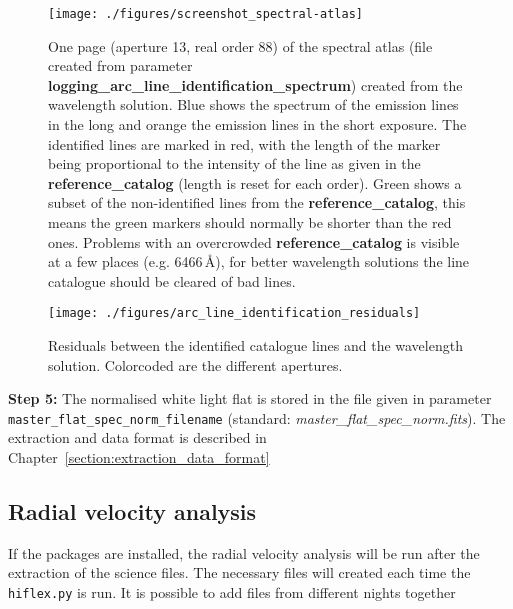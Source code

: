 \documentclass[10pt,a4paper]{article}
\begin{document}
\begin{figure} 
  \begin{center}
    \texttt{[image: ./figures/screenshot\_spectral-atlas]}
  \end{center} 
  \caption{One page (aperture 13, real order 88) of the spectral atlas (file created from parameter \textbf{logging\_arc\_line\_identification\_spectrum}) created from the wavelength solution. Blue shows the spectrum of the emission lines in the long and orange the emission lines in the short exposure. The identified lines are marked in red, with the length of the marker being proportional to the intensity of the line as given in the \textbf{reference\_catalog} (length is reset for each order). Green shows a subset of the non-identified lines from the \textbf{reference\_catalog}, this means the green markers should normally be shorter than the red ones. Problems with an overcrowded \textbf{reference\_catalog} is visible at a few places (e.g. 6466\,\AA), for better wavelength solutions the line catalogue should be cleared of bad lines.
    \label{figure_arc_line_identification_spectrum}}
\end{figure}


\begin{figure} 
  \begin{center}
    \texttt{[image: ./figures/arc\_line\_identification\_residuals]}
  \end{center} 
  \caption{Residuals between the identified catalogue lines and the wavelength solution. Colorcoded are the different apertures.
    \label{figure_arc_line_identification_residuals}}
\end{figure}

\vspace{0.5em}\noindent \textbf{Step 5:} The normalised white light flat is stored in the file given in parameter \verb|master_flat_spec_norm_filename| (standard: \textit{master\_flat\_spec\_norm.fits}). The extraction and data format is described in Chapter~\ref{section:extraction_data_format}

\subsection{Radial velocity analysis}
If the packages are installed, the radial velocity analysis will be run after the extraction of the science files. The necessary files will created each time the \verb|hiflex.py| is run. It is possible to add files from different nights together
\end{document}
